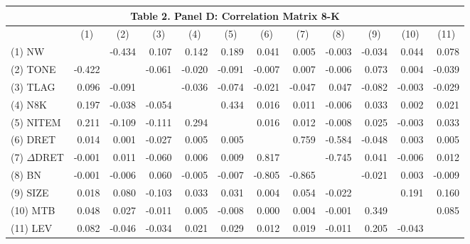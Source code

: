 \begin{table}[H] \label{T2PD}
  \centering
    \begin{tabular}{lrrrrrrrrrrr}
    \multicolumn{12}{c}{\textbf{Table 2. Panel D: Correlation Matrix 8-K}} \\
    \midrule
      & \multicolumn{1}{c}{(1)} & \multicolumn{1}{c}{(2)} & \multicolumn{1}{c}{(3)} & \multicolumn{1}{c}{(4)} & \multicolumn{1}{c}{(5)} & \multicolumn{1}{c}{(6)} & \multicolumn{1}{c}{(7)} & \multicolumn{1}{c}{(8)} & \multicolumn{1}{c}{(9)} & \multicolumn{1}{c}{(10)} & \multicolumn{1}{c}{(11)} \\
    \midrule
    (1) NW & & -0.434 & 0.107 & 0.142 & 0.189 & 0.041 & 0.005 & -0.003 & -0.034 & 0.044 & 0.078 \\
    (2) TONE & -0.422 &  & -0.061 & -0.020 & -0.091 & -0.007 & 0.007 & -0.006 & 0.073 & 0.004 & -0.039 \\
    (3) TLAG & 0.096 & -0.091 &  & -0.036 & -0.074 & -0.021 & -0.047 & 0.047 & -0.082 & -0.003 & -0.029 \\
    (4) N8K & 0.197 & -0.038 & -0.054 &  & 0.434 & 0.016 & 0.011 & -0.006 & 0.033 & 0.002 & 0.021 \\
    (5) NITEM & 0.211 & -0.109 & -0.111 & 0.294 &  & 0.016 & 0.012 & -0.008 & 0.025 & -0.003 & 0.033 \\
    (6) DRET & 0.014 & 0.001 & -0.027 & 0.005 & 0.005 &  & 0.759 & -0.584 & -0.048 & 0.003 & 0.005 \\
    (7) $\Delta$DRET & -0.001 & 0.011 & -0.060 & 0.006 & 0.009 & 0.817 &  & -0.745 & 0.041 & -0.006 & 0.012 \\
    (8) BN & -0.001 & -0.006 & 0.060 & -0.005 & -0.007 & -0.805 & -0.865 &  & -0.021 & 0.003 & -0.009 \\
    (9) SIZE & 0.018 & 0.080 & -0.103 & 0.033 & 0.031 & 0.004 & 0.054 & -0.022 &  & 0.191 & 0.160 \\
    (10) MTB & 0.048 & 0.027 & -0.011 & 0.005 & -0.008 & 0.000 & 0.004 & -0.001 & 0.349 &  & 0.085 \\
    (11) LEV & 0.082 & -0.046 & -0.034 & 0.021 & 0.029 & 0.012 & 0.019 & -0.011 & 0.205 & -0.043 &  \\
    \bottomrule
    \end{tabular}%
  \label{tab:addlabel}%
\end{table}%
